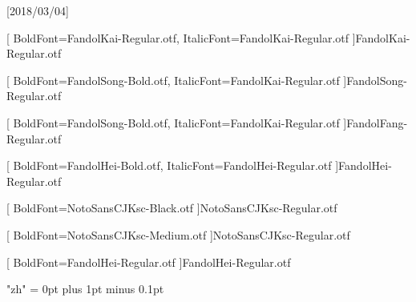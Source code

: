 
[2018/03/04]

\setsansfont{TeX Gyre Heros}	%





[
	BoldFont=FandolKai-Regular.otf, ItalicFont=FandolKai-Regular.otf
]{FandolKai-Regular.otf}

[
	BoldFont=FandolSong-Bold.otf,
	ItalicFont=FandolKai-Regular.otf
]{FandolSong-Regular.otf}

[
	BoldFont=FandolSong-Bold.otf,
	ItalicFont=FandolKai-Regular.otf
]{FandolFang-Regular.otf}

[
	BoldFont=FandolHei-Bold.otf,
	ItalicFont=FandolHei-Regular.otf
]{FandolHei-Regular.otf}


[
BoldFont=NotoSansCJKsc-Black.otf
]{NotoSansCJKsc-Regular.otf}


[
BoldFont=NotoSansCJKsc-Medium.otf
]{NotoSansCJKsc-Regular.otf}	%

[
	BoldFont=FandolHei-Regular.otf
]{FandolHei-Regular.otf}	%

\XeTeXlinebreaklocale "zh"
\XeTeXlinebreakskip = 0pt plus 1pt minus 0.1pt

\newcommand\kaishu{\CJKfamily{kai}} %
\newcommand\songti{\CJKfamily{song}} %
\newcommand\heiti{\CJKfamily{hei}}	%
\newcommand\thmheiti{\CJKfamily{hei2}}	%
\newcommand\fangsong{\CJKfamily{fangsong}} %
\renewcommand{\em}{\bfseries\CJKfamily{emfont}} %